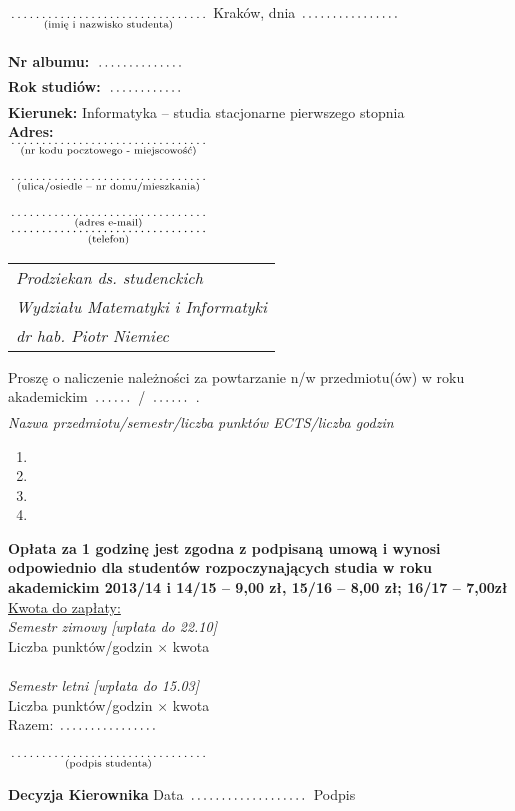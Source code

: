 \documentclass[a4paper,11pt]{article}
\newcommand{\fillField}[2]{
    $\underset{\text{#1}}{\parbox[t]{#2}{\dotfill}}$
}
\begin{document}
\noindent
\fillField{(imię i nazwisko studenta)}{5cm} \hfill Kraków, dnia \fillField{}{2.5cm} \\\\
\textbf{Nr albumu:}   \fillField{}{2.3cm}\\
\textbf{Rok studiów:} \fillField{}{2cm}\\
\textbf{Kierunek:} Informatyka -- studia stacjonarne pierwszego stopnia\\
\textbf{Adres:}\\
\fillField{(nr kodu pocztowego - miejscowość)}{5cm}\\\\
\fillField{(ulica/osiedle – nr domu/mieszkania)}{5cm}\\\\
\fillField{(adres e-mail)}{5cm}\\
\fillField{(telefon)}{5cm}
\phantom{a}\hfill
\begin{tabular}[c]{@{}l@{}}
\textit{Prodziekan ds. studenckich} \\
\textit{Wydziału Matematyki i Informatyki}\\
\textit{dr hab. Piotr Niemiec}
\end{tabular}

\vskip 1.5cm

\noindent
Proszę o naliczenie należności za powtarzanie n/w przedmiotu(ów) w roku\\ akademickim \fillField{}{1cm}/\fillField{}{1cm}.\\

\noindent
\textit{Nazwa przedmiotu/semestr/liczba punktów ECTS/liczba godzin}
\begin{enumerate}
    \item \dotfill
    \item \dotfill
    \item \dotfill
    \item \dotfill
\end{enumerate}
{\footnotesize \bf Opłata za 1 godzinę jest zgodna z podpisaną umową i wynosi odpowiednio dla studentów rozpoczynających studia w roku akademickim 2013/14 i 14/15 – 9,00 zł, 15/16 – 8,00 zł; 16/17 – 7,00zł}\\

\noindent
\underline{Kwota do zapłaty:}\\
\textit{Semestr zimowy [wpłata do 22.10]}\\
Liczba punktów/godzin \dotfill $\times$ kwota \dotfill \\\\
\textit{Semestr letni [wpłata do 15.03]}\\
Liczba punktów/godzin \dotfill $\times$ kwota \dotfill \\

\hspace{\fill} Razem: \fillField{}{2.5cm} \hspace{2.0cm}


\vskip 0.6cm

\hspace{\fill} \fillField{(podpis studenta)}{5cm} \hspace{2.0cm}
\vskip 1.0cm

\noindent
\textbf{Decyzja Kierownika} \dotfill
\vskip 0.5cm
\noindent
Data \fillField{}{3cm} Podpis \dotfill
\end{document}
